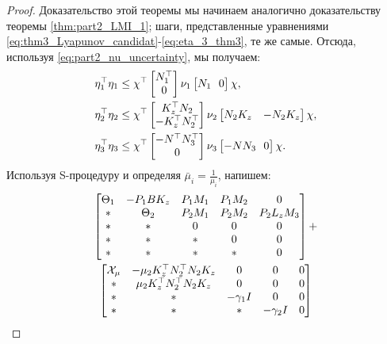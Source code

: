  \begin{proof}
 	Доказательство этой теоремы мы начинаем аналогично доказательству теоремы \ref{thm:part2_LMI_1}; шаги, представленные уравнениями \eqref{eq:thm3_Lyapunov_candidat}-\eqref{eq:eta_3_thm3}, те же самые. Отсюда, используя \eqref{eq:part2_nu_uncertainty}, мы получаем:
 	\begin{align}
 		\label{eq:eta1_bound}
 		\eta_1^\top\eta_1 &\leq \chi^\top \begin{bmatrix}
 			{N}_1^\top \\ 0  
 		\end{bmatrix}\nu_1\begin{bmatrix}
 			{N}_1 \ \ 0  
 		\end{bmatrix} \chi,
 		\\
 		\eta_2^\top\eta_2 &\leq \chi^\top \begin{bmatrix}
 			{K}_z^\top{N}_2 \\ -{K}_z^\top{N}_2^\top  
 		\end{bmatrix}\nu_2\begin{bmatrix}
 			{N}_2{K}_z & -{N}_2{K}_z
 		\end{bmatrix} \chi,
 		\\
 		\eta_3^\top\eta_3 &\leq \chi^\top \begin{bmatrix}
 			-{N}^\top{N}_3^\top \\ 0  
 		\end{bmatrix}\nu_3\begin{bmatrix}
 			-{N}{N}_3 \ \ 0  
 		\end{bmatrix} \chi.
 	\end{align}
 	Используя S-процедуру и определяя $\bar{\mu}_i=\frac{1}{\mu_i}$, напишем:
 	\begin{multline}
 		\begin{bmatrix}
 			{\Theta}_1 & -{P}_1{B}{K}_z & {P}_1{M}_1 & {P}_1{M}_2 &0 \\
 			* &    {\Theta}_2 & {P}_2{M}_1 & {P}_2{M}_2 & {P}_2{L}_z{M}_3\\
 			* & * & 0 & 0&0\\
 			* & * & * & 0&0 \\
 			* & * & * & *&0
 		\end{bmatrix} + \\
 		\begin{bmatrix}
 			\mathcal{X}_{\mu}& -\mu_2{K}_z^\top{N}_2^\top{N}_2{K}_z &0 &0 & 0\\
 			*&\mu_2{K}_z^\top{N}_2^\top{N}_2{K}_z&0&0&0\\
 			*&*&-\gamma_1{I}&0&0\\
 			*&*&*&-\gamma_2{I}&0\\

\end{bmatrix}
\end{multline}
\end{proof}
